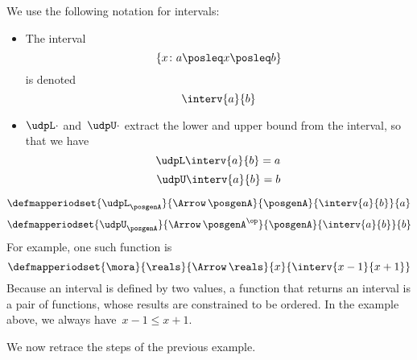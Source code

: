 We use the following notation for intervals:
\begin{itemize}
    \item The interval
          \begin{equation}
              \label{eq:interv-1}
              \{x\colon a \posleq x \posleq b\}
          \end{equation}
          is denoted
          \begin{equation}
              \label{eq:interv-2}
              \interv{a}{b}
          \end{equation}
    \item $\udpL\cdot$ and~$\udpU\cdot$ extract the lower and upper bound from the interval, so that we have
          \begin{equation}
              \label{eq:interv-L}
              \udpL \interv{a}{b} = a
          \end{equation}
          \begin{equation}
              \label{eq:interv-U}
              \udpU \interv{a}{b} = b
          \end{equation}
\end{itemize}
%
\begin{equation}
    \label{eq:interv-L-def}
    \defmapperiodset{\udpL_{\posgenA}}{\Arrow\,\posgenA}{\posgenA}%
    {\interv{a}{b}}{ a }
\end{equation}
%
\begin{equation}
    \label{eq:interv-U-def}
    \defmapperiodset{\udpU_{\posgenA}}{\Arrow\,\posgenA^{\op}}{\posgenA}%
    {\interv{a}{b}}{ b }
\end{equation}
%
For example, one such function is
%
\begin{equation}
    \label{eq:interval-func-example}
    \defmapperiodset{\mora}{\reals}{\Arrow\,\reals}%
    {x}{ \interv{x-1}{x+1}
    }
\end{equation}
Because an interval is defined by two values, a function that returns an interval is a pair of functions, whose results are constrained to be ordered.
In the example above, we always have~$x-1\leq x+1$.

We now retrace the steps of the previous example.

